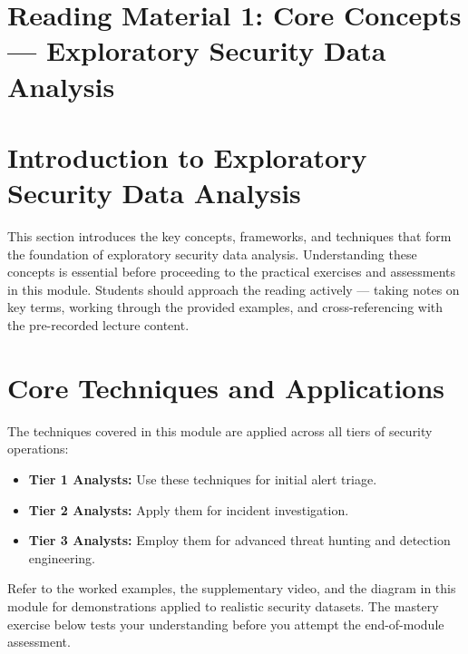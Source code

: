 \documentclass[12pt,a4paper]{article}
\begin{document}
\section*{Reading Material 1: Core Concepts --- Exploratory Security Data Analysis}

\section{Introduction to Exploratory Security Data Analysis}

This section introduces the key concepts, frameworks, and techniques that form the foundation of exploratory security data analysis. Understanding these concepts is essential before proceeding to the practical exercises and assessments in this module. Students should approach the reading actively --- taking notes on key terms, working through the provided examples, and cross-referencing with the pre-recorded lecture content.

\section{Core Techniques and Applications}

The techniques covered in this module are applied across all tiers of security operations:
\begin{itemize}
    \item \textbf{Tier 1 Analysts:} Use these techniques for initial alert triage.
    \item \textbf{Tier 2 Analysts:} Apply them for incident investigation.
    \item \textbf{Tier 3 Analysts:} Employ them for advanced threat hunting and detection engineering.
\end{itemize}

Refer to the worked examples, the supplementary video, and the diagram in this module for demonstrations applied to realistic security datasets. The mastery exercise below tests your understanding before you attempt the end-of-module assessment.
\end{document}

